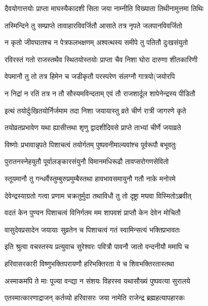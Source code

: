 \twolineshloka
{दैवयोगात्तयोः प्राप्ता माघस्यैकादशी सिता}
{जया नाम्नीति विख्याता तिथीनामुत्तमा तिथिः} %

\twolineshloka
{तस्मिन्दिने तु सम्प्राप्ते तावाहारविवर्जितौ}
{आसाते तत्र नृपते जलपानविवर्जितो} %

\twolineshloka
{न कृतो जीवघातश्च न पेत्रफलभक्षणम्}
{अश्वत्थस्य समीपे तु पतितौ दुःखसंयुतो} %

\twolineshloka
{रविरस्तं गतो राजस्तथैव स्थितयोस्तयोः}
{प्राप्ता चैव निशा घोरा दारुणा शीतकारिणी} %

\twolineshloka
{वेपमानौ तु तो तत्र हिमेन च जडीकृतौ}
{परस्परेण संलग्नौ गात्रयो(जयोरपि} %

\twolineshloka
{न निद्रां न रतिं तत्र न तौ सौस्यमविन्दताम्}
{एवं तौ राजशार्दूल शापेनेन्द्रस्य पीडितौ} %

\twolineshloka
{इत्थं तयोर्दुःखितयोर्निर्जमाम तदा निशा}
{जयायास्तु व्रते चीर्ण रात्री जागरणे कृते} %

\twolineshloka
{तयोव्रतप्रभावेण यथा ह्यासीत्तथा शृणु}
{द्वादशीदिवसे प्राप्ते ताभ्यां चीर्णे जयाव्रते} %

\twolineshloka
{विष्णोः प्रभावान्नृपते पिशाचत्वं तयोर्गतम्}
{पुष्पवनीमाल्यवांश्च पूर्वरूपौ बभूवतुः} %

\twolineshloka
{पुरातनस्नेहयुतौ पूर्वालङ्कारसंयुनौ}
{विमानमधिरूढौ तावप्सरोगणसेवितो} %

\twolineshloka
{स्तूयमानौ तु गन्धर्वैस्तुम्बुरुप्रमुम्बैस्तथा}
{हावभावसमायुनौ गतौ नाके मनोरमे} %

\twolineshloka
{देवेन्द्रस्याग्रतो गत्वा प्रणाम चक्रतुर्मुदा}
{तथाविधौ तु तो दृष्ट्रा मघवा विस्मितोऽब्रवीत्} %


\twolineshloka
{वदतं केन पुण्यन पिशाचत्वं विनिर्गतम}
{मम शापवशं प्राप्तौ केन देवेन मोचितौ} %


\twolineshloka
{वासुदेवप्रसादेन जयायाः सुव्रतेन च}
{पिशाचत्वं गतं स्वामिन्सत्यं भक्तिप्रभावतः} %

\twolineshloka
{इति श्रुत्वा वचस्तस्य प्रत्युवाच सुरेश्वरः}
{पवित्रौ पावनौ जातो वन्दनीयौ ममापि च} %

\twolineshloka
{हरिवासरकारी विष्णुभक्तिपरायणौ}
{हरिभक्तिरता ये च शिवभक्तिरतास्तथा} %

\twolineshloka
{अस्माकमपि ते माः पूज्या वन्द्या न संशयः}
{विहरस्व यथासौख्यं पुष्पवत्या सुरालये} %

\twolineshloka
{एतस्मात्कारणाद्राजन् कर्तव्यो हरिवासरः}
{जया नामेति राजेन्द्र ब्रह्महत्यापहारकः} %

